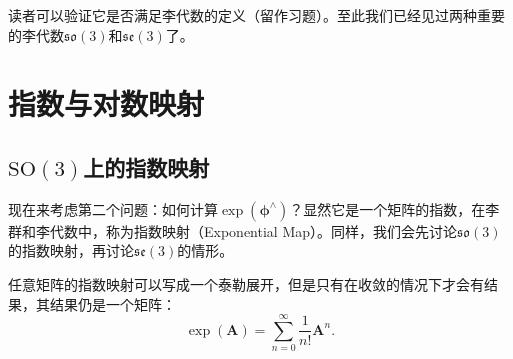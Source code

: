 读者可以验证它是否满足李代数的定义（留作习题）。至此我们已经见过两种重要的李代数$\mathfrak{so}(3)$和$\mathfrak{se}(3)$了。

\section{指数与对数映射}

\subsection{$\mathrm{SO}(3)$上的指数映射}

现在来考虑第二个问题：如何计算$\exp ( \boldsymbol{\phi}^{\wedge} )$？显然它是一个矩阵的指数，在李群和李代数中，称为指数映射（Exponential Map）。同样，我们会先讨论$\mathfrak{so}(3)$的指数映射，再讨论$\mathfrak{se}(3)$的情形。

任意矩阵的指数映射可以写成一个泰勒展开，但是只有在收敛的情况下才会有结果，其结果仍是一个矩阵：
\begin{equation}
\exp(\bm{A}) = \sum\limits_{n = 0}^\infty  {\frac{1}{{n!}}{ \bm{A}^n}}.
\end{equation}

